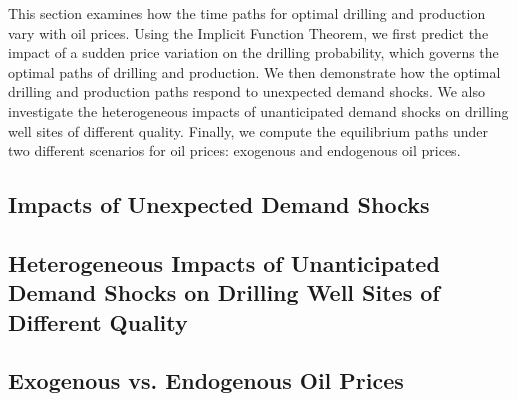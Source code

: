 This section examines how the time paths for optimal drilling and production vary with oil prices. Using the Implicit Function Theorem, we first predict the impact of a sudden price variation on the drilling probability, which governs the optimal paths of drilling and production. We then demonstrate how the optimal drilling and production paths respond to unexpected demand shocks. We also investigate the heterogeneous impacts of unanticipated demand shocks on drilling well sites of different quality. Finally, we compute the equilibrium paths under two different scenarios for oil prices: exogenous and endogenous oil prices.


\subsection{Impacts of Unexpected Demand Shocks}
\label{C3-SubSection:Impacts-of-Unexpected-Demand-Shocks}


\subsection{Heterogeneous Impacts of Unanticipated Demand Shocks on Drilling Well Sites of Different Quality}
\label{C3-SubSection:Heterogeneous-Impacts-of-Unanticipated-Demand-Shocks-on-Drilling-Well-Sites-of-Different-Quality}


\subsection{Exogenous vs. Endogenous Oil Prices}
\label{C3-SubSection:Exogenous-vs-Endogenous-Oil-Prices}

